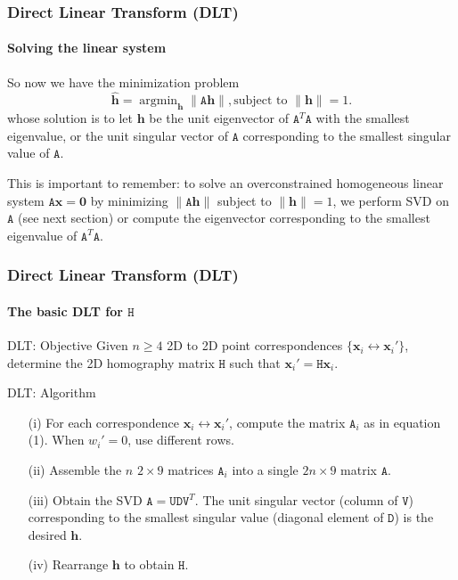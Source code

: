 \documentclass[aspectratio=169]{beamer}
\renewcommand{\vec}[1]{\boldsymbol{#1}}
\newcommand{\mat}[1]{\mathtt{#1}}
\DeclareMathOperator*{\argmin}{argmin}
\begin{document}
\begin{frame}
\frametitle{Direct Linear Transform (DLT)}
\framesubtitle{Solving the linear system}

So now we have the minimization problem
\begin{equation*}
\hat{\vec{h}} = \argmin_{\vec{h}} \|\mat{A}\vec{h}\|, \text{subject to }
\|\vec{h}\|=1.
\end{equation*}
whose solution is to let $\vec{h}$ be the unit eigenvector of
$\mat{A}^T\mat{A}$ with the smallest eigenvalue, or the unit singular
vector of $\mat{A}$ corresponding to the smallest singular value of
$\mat{A}$.

\medskip

\alert{This is important to remember:} to solve an overconstrained
homogeneous linear system $\mat{A}\vec{x}=\vec{0}$ by minimizing
$\|\mat{A}\vec{h}\|$ subject to $\|\vec{h}\|=1$, we \alert{perform SVD
  on $\mat{A}$} (see next section) or \alert{compute the eigenvector
  corresponding to the smallest eigenvalue of $\mat{A}^T\mat{A}$}.

\end{frame}

\begin{frame}
\frametitle{Direct Linear Transform (DLT)}
\framesubtitle{The basic DLT for $\mat{H}$}

\begin{block}{DLT: Objective}
Given $n \ge 4$ 2D to 2D point correspondences $\{ \vec{x}_i
\leftrightarrow \vec{x}_i' \}$, determine the 2D homography matrix
$\mat{H}$ such that $\vec{x}_i' = \mat{H}\vec{x}_i$.
\end{block}

\begin{block}{DLT: Algorithm}
\begin{itemize}
\item[(i)] For each correspondence $\vec{x}_i \leftrightarrow
  \vec{x}_i'$, compute the matrix $\mat{A}_i$ as in equation
  (1).  When $w_i'=0$, use different rows.
\item[(ii)] Assemble the $n$ $2\times 9$ matrices $\mat{A}_i$ into a
  single $2n\times 9$ matrix $\mat{A}$.
\item[(iii)] Obtain the SVD $\mat{A}=\mat{U}\mat{D}\mat{V}^T$.  The
  unit singular vector (column of $\mat{V}$) corresponding to the
  smallest singular value (diagonal element of $\mat{D}$) is the
  desired $\vec{h}$.
\item[(iv)] Rearrange $\vec{h}$ to obtain $\mat{H}$.
\end{itemize}
\end{block}

\end{frame}
\end{document}
